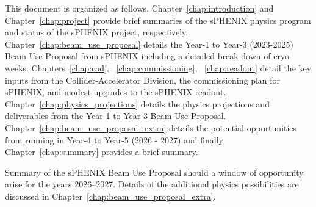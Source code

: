 This document is organized as follows.    Chapter~\ref{chap:introduction} and Chapter~\ref{chap:project} provide brief summaries of the sPHENIX physics program and status of the sPHENIX project, respectively.    Chapter~\ref{chap:beam_use_proposal} details the Year-1 to Year-3 (2023-2025) Beam Use Proposal from sPHENIX including a detailed break down of cryo-weeks.    Chapters~\ref{chap:cad}, ~\ref{chap:commissioning}, ~\ref{chap:readout} detail the key inputs from the Collider-Accelerator Division, the commissioning plan for sPHENIX, and modest upgrades to the sPHENIX readout.    Chapter~\ref{chap:physics_projections} details the physics projections and deliverables from the Year-1 to Year-3 Beam Use Proposal.    Chapter~\ref{chap:beam_use_proposal_extra} details the potential opportunities from running in Year-4 to Year-5 (2026 - 2027) and finally Chapter~\ref{chap:summary} provides a brief summary. 

%

\begin{table}[h]
\centering
\caption{ \label{tab:exec:summary2} Summary of the sPHENIX Beam Use Proposal should a window of
  opportunity arise for the years 2026--2027. Details of the
  additional physics possibilities are discussed in
  Chapter~\ref{chap:beam_use_proposal_extra}.}  
\bigskip
\centering

\end{table}

